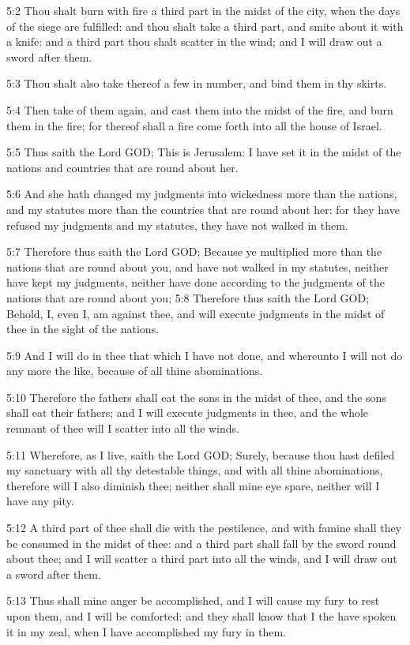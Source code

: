 5:2 Thou shalt burn with fire a third part in the midst of the city,
when the days of the siege are fulfilled: and thou shalt take a third
part, and smite about it with a knife: and a third part thou shalt
scatter in the wind; and I will draw out a sword after them.

5:3 Thou shalt also take thereof a few in number, and bind them in thy
skirts.

5:4 Then take of them again, and cast them into the midst of the fire,
and burn them in the fire; for thereof shall a fire come forth into
all the house of Israel.

5:5 Thus saith the Lord GOD; This is Jerusalem: I have set it in the
midst of the nations and countries that are round about her.

5:6 And she hath changed my judgments into wickedness more than the
nations, and my statutes more than the countries that are round about
her: for they have refused my judgments and my statutes, they have not
walked in them.

5:7 Therefore thus saith the Lord GOD; Because ye multiplied more than
the nations that are round about you, and have not walked in my
statutes, neither have kept my judgments, neither have done according
to the judgments of the nations that are round about you; 5:8
Therefore thus saith the Lord GOD; Behold, I, even I, am against thee,
and will execute judgments in the midst of thee in the sight of the
nations.

5:9 And I will do in thee that which I have not done, and whereunto I
will not do any more the like, because of all thine abominations.

5:10 Therefore the fathers shall eat the sons in the midst of thee,
and the sons shall eat their fathers; and I will execute judgments in
thee, and the whole remnant of thee will I scatter into all the winds.

5:11 Wherefore, as I live, saith the Lord GOD; Surely, because thou
hast defiled my sanctuary with all thy detestable things, and with all
thine abominations, therefore will I also diminish thee; neither shall
mine eye spare, neither will I have any pity.

5:12 A third part of thee shall die with the pestilence, and with
famine shall they be consumed in the midst of thee: and a third part
shall fall by the sword round about thee; and I will scatter a third
part into all the winds, and I will draw out a sword after them.

5:13 Thus shall mine anger be accomplished, and I will cause my fury
to rest upon them, and I will be comforted: and they shall know that I
the \LORD have spoken it in my zeal, when I have accomplished my fury
in them.

